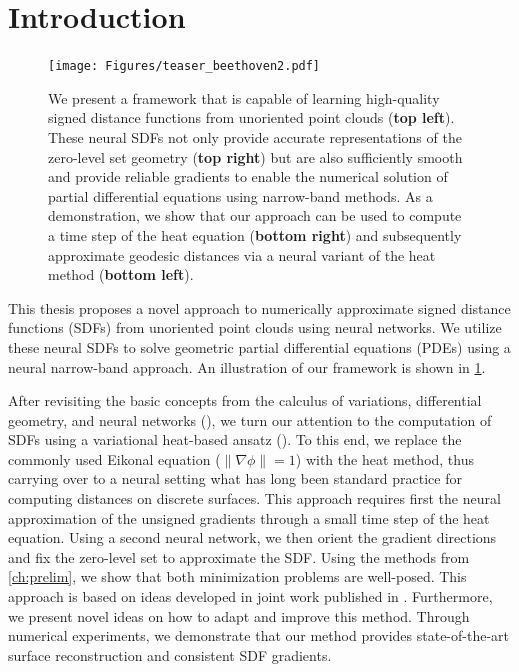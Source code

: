 \documentclass[12pt,openany]{book}
\theoremstyle{plainnormal}
\theoremstyle{remark}
\begin{document}
\section*{Introduction}
\begin{figure}
    \centering
    \texttt{[image: Figures/teaser\_beethoven2.pdf]}
    \caption{We present a framework that is capable of learning high-quality signed distance functions from unoriented point clouds (\textbf{top left}). These neural SDFs not only provide accurate representations of the zero-level set geometry (\textbf{top right}) but are also sufficiently smooth and provide reliable gradients to enable the numerical solution of partial differential equations using narrow-band methods. As a demonstration, we show that our approach can be used to compute a time step of the heat equation (\textbf{bottom right}) and subsequently approximate geodesic distances via a neural variant of the heat method (\textbf{bottom left}). }
    \label{teaser}
\end{figure}
This thesis proposes a novel approach to numerically approximate signed distance functions (SDFs) from unoriented point clouds using neural networks. We utilize these neural SDFs to solve geometric partial differential equations (PDEs) using a neural narrow-band approach. An illustration of our framework is shown in \cref{teaser}.
\par
After revisiting the basic concepts from the calculus of variations, differential geometry, and neural networks (), we turn our attention to the computation of SDFs using a variational heat-based ansatz (). To this end, we replace the commonly used Eikonal equation ($\|\nabla \phi\| = 1$) with the heat method, thus carrying over to a neural setting what has long been standard practice for computing distances on discrete surfaces. This approach requires first the neural approximation of the unsigned gradients through a small time step of the heat equation. Using a second neural network, we then orient the gradient directions and fix the zero-level set to approximate the SDF. Using the methods from \cref{ch:prelim}, we show that both minimization problems are well-posed. This approach is based on ideas developed in joint work published in \cite{weidemaier2025sdfsunorientedpointclouds}. Furthermore, we present novel ideas on how to adapt and improve this method. Through numerical experiments, we demonstrate that our method provides state-of-the-art surface reconstruction and consistent SDF gradients.\par
\end{document}

